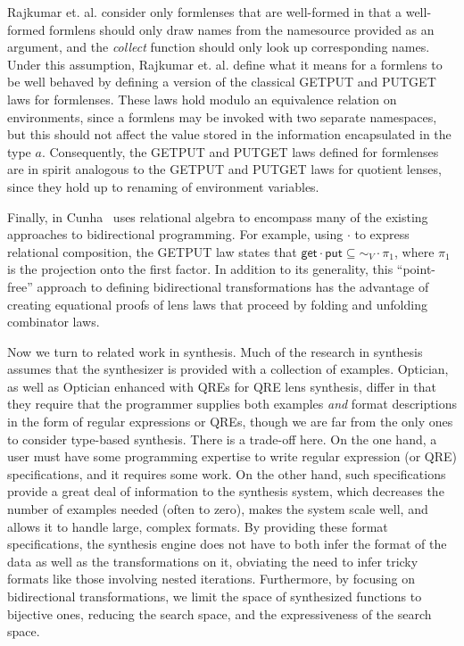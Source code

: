 \documentclass[acmsmall,review,anonymous]{acmart}
\newcommand{\codefont}[1]{\ensuremath{\mathsf{#1}}}
\newcommand{\kw}[1]{\codefont{#1}}
\newcommand{\get}{\ensuremath{\kw{get}}}
\newcommand{\lput}{\ensuremath{\kw{put}}}
\begin{document}
Rajkumar et. al. consider only formlenses that are well-formed in that a
well-formed formlens should only draw names from the namesource provided as an
argument, and the {\em collect} function should only look up corresponding
names.
Under this assumption, Rajkumar et. al. define what it means for a formlens to
be well behaved by defining a version of the classical GETPUT and PUTGET laws
for formlenses. These laws hold modulo an equivalence relation on environments,
since a formlens may be invoked with two separate namespaces, but this should
not affect the value stored in the information encapsulated in the type $a$.
Consequently, the GETPUT and PUTGET laws defined for formlenses are in spirit
analogous to the GETPUT and PUTGET laws for quotient lenses, since they hold up
to renaming of environment variables.

Finally, in Cunha~\cite{cunha2010relational} uses relational algebra to
encompass many of the existing approaches to bidirectional programming. For
example, using $\cdot$ to express relational composition, the GETPUT law states
that $\get \cdot \lput \subseteq \sim_V \cdot \pi_1$, where $\pi_1$ is the
projection onto the first factor. In addition to its generality, this
``point-free'' approach to defining bidirectional transformations has the
advantage of creating equational proofs of lens laws that proceed by folding
and unfolding combinator laws.

Now we turn to related work in synthesis. Much of the research in synthesis
assumes that the synthesizer is provided with a collection of examples.
Optician, as well as Optician enhanced with QREs for QRE lens synthesis, differ
in that they require that the programmer supplies both examples {\em and}
format descriptions in the form of regular expressions or QREs, though we are
far from the only ones to consider type-based synthesis.
There is a trade-off here.  On the one hand, a user must have some programming
expertise to write regular expression (or QRE) specifications, and it requires
some work. On the other hand, such specifications provide a great deal of
information to the synthesis system, which decreases the number of examples
needed (often to zero), makes the system scale well, and allows it to handle
large, complex formats.  By providing these format specifications, the 
synthesis engine does not have to both infer the format of the data as well as
the transformations on it, obviating the need to infer tricky formats like
those involving nested iterations. Furthermore, by focusing on bidirectional
transformations, we limit the space of synthesized functions to bijective ones,
reducing the search space, and the expressiveness of the search space.
\end{document}
